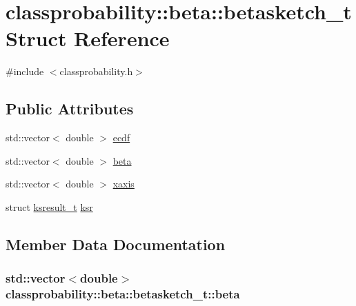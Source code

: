 \hypertarget{structclassprobability_1_1beta_1_1betasketch__t}{}\section{classprobability\+:\+:beta\+:\+:betasketch\+\_\+t Struct Reference}
\label{structclassprobability_1_1beta_1_1betasketch__t}


{\ttfamily \#include $<$classprobability.\+h$>$}

\subsection*{Public Attributes}
\begin{DoxyCompactItemize}
\item 
std\+::vector$<$ double $>$ \hyperlink{structclassprobability_1_1beta_1_1betasketch__t_a3111cdadf85f43b8681a6439455b31ff}{ecdf}
\item 
std\+::vector$<$ double $>$ \hyperlink{structclassprobability_1_1beta_1_1betasketch__t_a728def84abb05793a6b81f5bc2c6b0ca}{beta}
\item 
std\+::vector$<$ double $>$ \hyperlink{structclassprobability_1_1beta_1_1betasketch__t_a61516db859081da178979dbcb9e092e7}{xaxis}
\item 
struct \hyperlink{structclassprobability_1_1beta_1_1ksresult__t}{ksresult\+\_\+t} \hyperlink{structclassprobability_1_1beta_1_1betasketch__t_aeb3ed655d83a116c51cbe6fc0212db9d}{ksr}
\end{DoxyCompactItemize}


\subsection{Member Data Documentation}
\subsubsection[{\texorpdfstring{beta}{beta}}]{\setlength{\rightskip}{0pt plus 5cm}std\+::vector$<$double$>$ classprobability\+::beta\+::betasketch\+\_\+t\+::beta}\hypertarget{structclassprobability_1_1beta_1_1betasketch__t_a728def84abb05793a6b81f5bc2c6b0ca}{}\label{structclassprobability_1_1beta_1_1betasketch__t_a728def84abb05793a6b81f5bc2c6b0ca}
